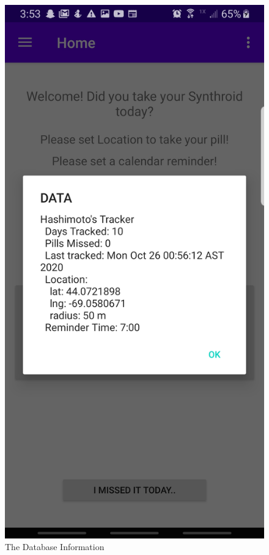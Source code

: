 \documentclass{article}
\begin{document}
\begin{figure}[H]
\centering
\includegraphics[scale= .1]{img/data.jpg}
\caption{The Database Information}
\label{fig:database} 
\end{figure}
\end{document}
